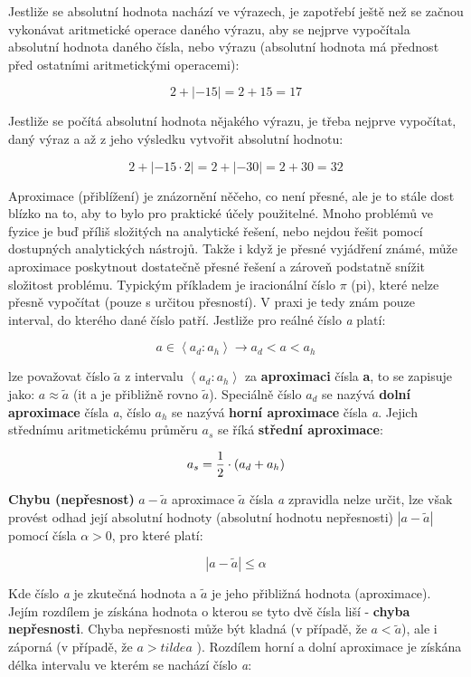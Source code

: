Jestliže se absolutní hodnota nachází ve výrazech, je zapotřebí ještě než se začnou vykonávat aritmetické operace daného výrazu, aby se nejprve vypočítala absolutní hodnota daného čísla, nebo výrazu (absolutní hodnota má přednost před ostatními aritmetickými operacemi):

$$ 2 +|-15| = 2 + 15 = 17 $$

Jestliže se počítá absolutní hodnota nějakého výrazu, je třeba nejprve vypočítat, daný výraz a až z jeho výsledku vytvořit absolutní hodnotu:

$$ 2 + |-15\cdot2| = 2 + |-30| = 2 + 30 = 32 $$


Aproximace (přiblížení) je znázornění něčeho, co není přesné, ale je to stále dost blízko na to, aby to bylo pro praktické účely použitelné. Mnoho problémů ve fyzice je buď příliš složitých na analytické řešení, nebo nejdou řešit pomocí dostupných analytických nástrojů. Takže i když je přesné vyjádření známé, může aproximace poskytnout dostatečně přesné řešení a zároveň podstatně snížit složitost problému. Typickým příkladem je iracionální číslo $\pi$ (pi), které nelze přesně vypočítat (pouze s určitou přesností). V praxi je tedy znám pouze interval, do kterého dané číslo patří. Jestliže pro reálné číslo {\it a} platí:

$$ a \in \left< a_d : a_h \right> \rightarrow  a_d < a < a_h$$

lze považovat číslo $\tilde{a}$ z intervalu  $\left< a_d : a_h \right>$ za {\bf aproximaci} čísla {\bf a}, to se zapisuje jako: $a \approx
 \tilde{a}$ ({it a} je přibližně rovno $\tilde{a}$). Speciálně číslo $a_d$ se nazývá {\bf dolní aproximace} čísla {\it a}, číslo $a_h$ se nazývá {\bf horní aproximace} čísla {\it a}. Jejich střednímu aritmetickému průměru $a_s$ se říká {\bf střední aproximace}:

 $$ a_s = {1\over 2}\cdot (a_d+a_h) $$

 {\bf Chybu (nepřesnost)} $a-\tilde{a}$ aproximace $\tilde{a}$ čísla {\it a} zpravidla nelze určit, lze však provést odhad její absolutní hodnoty (absolutní hodnotu nepřesnosti) $|a - \tilde{a}|$ pomocí čísla $ \alpha > 0 $, pro které platí:

 $$ |a - \tilde{a}| \leq \alpha  $$


 Kde číslo {\it a} je zkutečná hodnota a $\tilde{a}$ je jeho přibližná hodnota (aproximace). Jejím rozdílem je získána hodnota o kterou se tyto dvě čísla liší - {\bf chyba nepřesnosti}. Chyba nepřesnosti může být kladná (v případě, že $a < \tilde{a}$), ale i záporná (v případě, že $a>tilde{a}$ ). Rozdílem horní a dolní aproximace je získána délka intervalu ve kterém se nachází číslo {\it a}:

